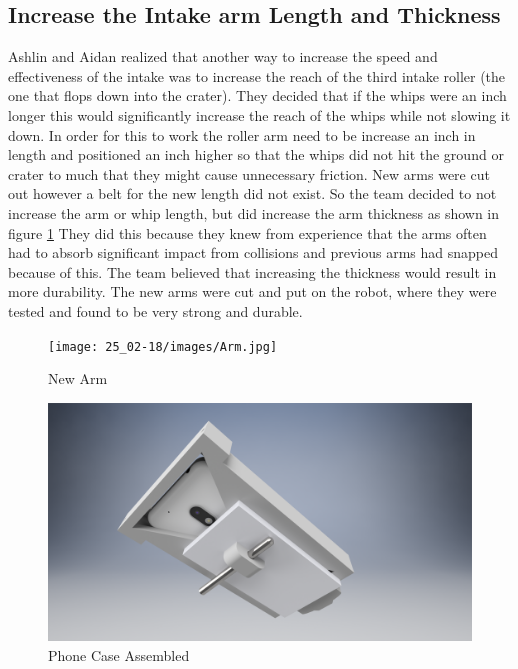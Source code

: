 \documentclass{article}
\begin{document}
\subsection{Increase the Intake arm Length and Thickness}
Ashlin and Aidan realized that another way to increase the speed and effectiveness of the intake was to increase the reach of the third intake roller (the one that flops down into the crater). They decided that if the whips were an inch longer this would significantly increase the reach of the whips while not slowing it down. In order for this to work the roller arm need to be increase an inch in length and positioned an inch higher so that the whips did not hit the ground or crater to much that they might cause unnecessary friction. New arms were cut out however a belt for the new length did not exist. So the team decided to not increase the arm or whip length, but did increase the arm thickness as shown in figure \ref{fig:arm} They did this because they knew from experience that the arms often had to absorb significant impact from collisions and previous arms had snapped because of this. The team believed that increasing the thickness would result in more durability. The new arms were cut and put on the robot, where they were tested and found to be very strong and durable.

\begin{figure}
    \centering
    \texttt{[image: 25\_02-18/images/Arm.jpg]}
    \caption{New Arm}
    \label{fig:arm}
\end{figure}

\begin{figure}
    \centering
    \includegraphics[width= 0.5 \textwidth]{25_02-18/images/phoneMount.png}
    \caption{Phone Case Assembled}
    \label{fig: phone case}
\end{figure}
\end{document}
